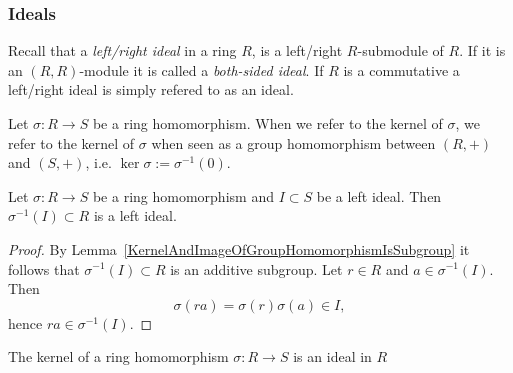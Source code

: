 \subsubsection{Ideals}
\begin{definition}
    Recall that a \textit{left/right ideal} in a ring $R$, is a left/right $R$-submodule of $R$. If it is an $(R,R)$-module it is called a \textit{both-sided ideal}. If $R$ is a commutative a left/right ideal is simply refered to as an ideal.   
\end{definition}
\begin{definition}
    Let $\sigma : R \rightarrow S$ be a ring homomorphism. When we refer to the kernel of $\sigma$, we refer to the kernel of $\sigma$ when seen as a group homomorphism between $(R,+)$ and $(S,+)$, i.e. $\ker \sigma := \sigma^{-1}(0).$
\end{definition}
\begin{lemma}
    Let $\sigma : R \rightarrow S$ be a ring homomorphism and $I \subset S$ be a left ideal. Then $\sigma^{-1}(I)\subset R$ is a left ideal. 
\end{lemma}
\begin{proof}
    By Lemma~\ref{KernelAndImageOfGroupHomomorphismIsSubgroup}  it follows that $\sigma^{-1}(I)\subset R$ is an additive subgroup. Let $r\in R$ and $a\in \sigma^{-1}(I)$. Then
    $$\sigma(ra)=\sigma(r)\sigma(a)\in I,$$
    hence $ra \in \sigma^{-1}(I)$.
\end{proof}
\begin{corollary}\label{TheKernelOfARingHomomorphismIsAnIdeal}
    The kernel of a ring homomorphism $\sigma : R \rightarrow S$ is an ideal in $R$
\end{corollary}

